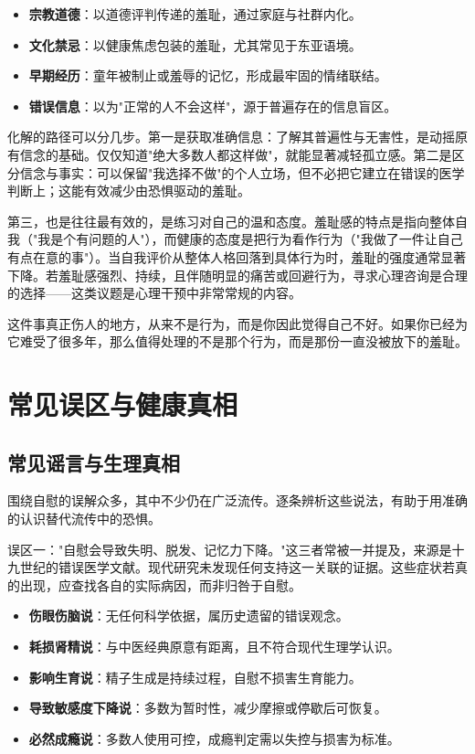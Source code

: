 \documentclass[12pt,UTF8]{ctexbook}
\newcommand{\keyword}[1]{\textbf{#1}}
\begin{document}
\begin{itemize}
	\item \keyword{宗教道德}：以道德评判传递的羞耻，通过家庭与社群内化。
	\item \keyword{文化禁忌}：以健康焦虑包装的羞耻，尤其常见于东亚语境。
	\item \keyword{早期经历}：童年被制止或羞辱的记忆，形成最牢固的情绪联结。
	\item \keyword{错误信息}：以为"正常的人不会这样"，源于普遍存在的信息盲区。
\end{itemize}

化解的路径可以分几步。第一是获取准确信息：了解其普遍性与无害性，是动摇原有信念的基础。仅仅知道"绝大多数人都这样做"，就能显著减轻孤立感。第二是区分信念与事实：可以保留"我选择不做"的个人立场，但不必把它建立在错误的医学判断上；这能有效减少由恐惧驱动的羞耻。

第三，也是往往最有效的，是练习对自己的温和态度。羞耻感的特点是指向整体自我（"我是个有问题的人"），而健康的态度是把行为看作行为（"我做了一件让自己有点在意的事"）。当自我评价从整体人格回落到具体行为时，羞耻的强度通常显著下降。若羞耻感强烈、持续，且伴随明显的痛苦或回避行为，寻求心理咨询是合理的选择——这类议题是心理干预中非常常规的内容。

\begin{tcolorbox}[colback=pink!5!white,colframe=red!50!black,title=贴心小叮咛]
	这件事真正伤人的地方，从来不是行为，而是你因此觉得自己不好。如果你已经为它难受了很多年，那么值得处理的不是那个行为，而是那份一直没被放下的羞耻。
\end{tcolorbox}

\section{常见误区与健康真相}
\subsection{常见谣言与生理真相}

围绕自慰的误解众多，其中不少仍在广泛流传。逐条辨析这些说法，有助于用准确的认识替代流传中的恐惧。

误区一："自慰会导致失明、脱发、记忆力下降。"这三者常被一并提及，来源是十九世纪的错误医学文献。现代研究未发现任何支持这一关联的证据。这些症状若真的出现，应查找各自的实际病因，而非归咎于自慰。

\begin{itemize}
	\item \keyword{伤眼伤脑说}：无任何科学依据，属历史遗留的错误观念。
	\item \keyword{耗损肾精说}：与中医经典原意有距离，且不符合现代生理学认识。
	\item \keyword{影响生育说}：精子生成是持续过程，自慰不损害生育能力。
	\item \keyword{导致敏感度下降说}：多数为暂时性，减少摩擦或停歇后可恢复。
	\item \keyword{必然成瘾说}：多数人使用可控，成瘾判定需以失控与损害为标准。
\end{itemize}
\end{document}
